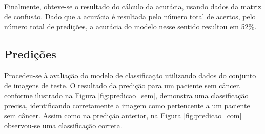 Finalmente, obteve-se o resultado do cálculo da acurácia, usando dados da matriz de confusão. Dado que a acurácia é resultada pelo número total de acertos, pelo número total de predições, a acurácia do modelo nesse sentido resultou em 52\%.



\subsection{\esp Predições} \label{pred}

Procedeu-se à avaliação do modelo de classificação utilizando dados do conjunto de imagens de teste. O resultado da predição para um paciente sem câncer, conforme ilustrado na Figura \ref{fig:predicao_sem}, demonstra uma classificação precisa, identificando corretamente a imagem como pertencente a um paciente sem câncer. Assim como na predição anterior, na Figura \ref{fig:predicao_com} observou-se uma classificação correta.


